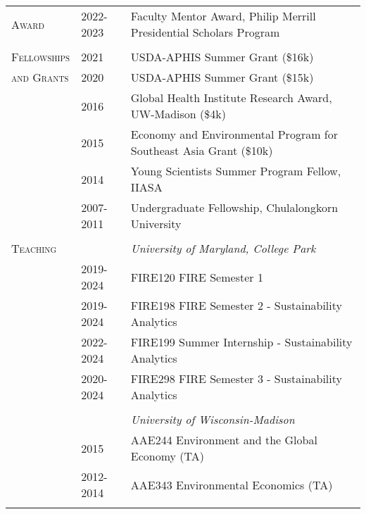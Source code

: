 \documentclass[letterpaper,11pt,oneside]{article}\usepackage[]{graphicx}\usepackage[]{xcolor}
\begin{document}
\noindent \begin{tabular}{p{1.2in} p{0.9in} l}     
\textsc{Award} & 2022-2023 & Faculty Mentor Award, Philip Merrill Presidential Scholars Program \\	
               & & \\
\textsc{Fellowships}	& 2021				& USDA-APHIS Summer Grant (\$16k) \\
\textsc{and Grants }	& 2020				& USDA-APHIS Summer Grant (\$15k) \\
                    	& 2016				& Global Health Institute Research Award, UW-Madison (\$4k) \\
                    	& 2015				& Economy and Environmental Program for Southeast Asia Grant (\$10k) \\
                    	& 2014				& Young Scientists Summer Program Fellow, IIASA \\
                    	& 2007-2011		& Undergraduate Fellowship, Chulalongkorn University \\
                    	& & \\
                    	
\textsc{Teaching}     & & \textit{University of Maryland, College Park} \\
                      & 2019-2024     & FIRE120 FIRE Semester 1 \\
		                  & 2019-2024     & FIRE198 FIRE Semester 2 - Sustainability Analytics \href{https://github.com/ruangmas/ruangmas.github.io/blob/main/documents/FIRE198.pdf}{\color{blue}{[SYLLABUS]}}\\
                      & 2022-2024     & FIRE199 Summer Internship - Sustainability Analytics \href{https://github.com/ruangmas/ruangmas.github.io/blob/main/documents/FIRE199.pdf}{\color{blue}{[SYLLABUS]}}\\
				              & 2020-2024	    & FIRE298 FIRE Semester 3 - Sustainability Analytics \href{https://github.com/ruangmas/ruangmas.github.io/blob/main/documents/FIRE298.pdf}{\color{blue}{[SYLLABUS]}}\\ 
				              & & \\
                      &               & \textit{University of Wisconsin-Madison} \\
				              & 2015          & AAE244 Environment and the Global Economy (TA) \\
				              & 2012-2014     & AAE343 Environmental Economics (TA)\\
				              & & \\
                        	

\end{tabular}
\end{document}
